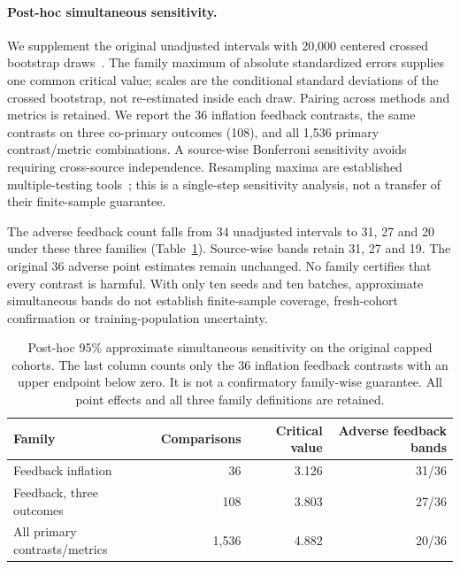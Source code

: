 \documentclass[11pt]{article}
\begin{document}
\paragraph{Post-hoc simultaneous sensitivity.}
We supplement the original unadjusted intervals with 20,000 centered crossed
bootstrap draws~\cite{pigeonhole}. The family maximum of absolute standardized
errors supplies one common critical value; scales are the conditional standard
deviations of the crossed bootstrap, not re-estimated inside each draw.
Pairing across methods and metrics is retained. We report the 36 inflation
feedback contrasts, the same contrasts on three co-primary outcomes (108),
and all 1,536 primary contrast/metric combinations. A source-wise Bonferroni
sensitivity avoids requiring cross-source independence. Resampling maxima
are established multiple-testing tools~\cite{romanowolf}; this is a single-step
sensitivity analysis, not a transfer of their finite-sample guarantee.

The adverse feedback count falls from 34 unadjusted intervals to 31, 27 and
20 under these three families (Table~\ref{tab:simultaneous}). Source-wise bands
retain 31, 27 and 19. The original 36 adverse point estimates remain unchanged.
No family certifies that every contrast is harmful. With only ten seeds and
ten batches, approximate simultaneous bands do not establish finite-sample
coverage, fresh-cohort confirmation or training-population uncertainty.

\begin{table}[htbp]\centering\small
\begin{tabular}{lrrr}\toprule
Family & Comparisons & Critical value & Adverse feedback bands\\\midrule
Feedback inflation & 36 & 3.126 & 31/36\\
Feedback, three outcomes & 108 & 3.803 & 27/36\\
All primary contrasts/metrics & 1,536 & 4.882 & 20/36\\\bottomrule
\end{tabular}
\caption{Post-hoc 95\% approximate simultaneous sensitivity on the original
capped cohorts. The last column counts only the 36 inflation feedback contrasts
with an upper endpoint below zero. It is not a confirmatory family-wise
guarantee. All point effects and all three family definitions are retained.}
\label{tab:simultaneous}\end{table}
\end{document}

